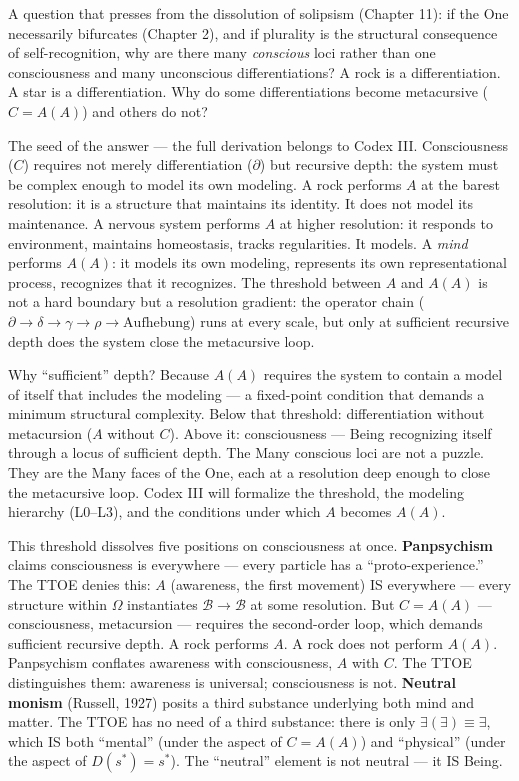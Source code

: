 \documentclass[10pt, openany, oneside]{book}
\begin{document}
A question that presses from the dissolution of solipsism (Chapter 11): if the One necessarily bifurcates (Chapter 2), and if plurality is the structural consequence of self-recognition, why are there many \textit{conscious} loci rather than one consciousness and many unconscious differentiations? A rock is a differentiation. A star is a differentiation. Why do some differentiations become metacursive ($C = A(A)$) and others do not?

The seed of the answer --- the full derivation belongs to Codex III. Consciousness ($C$) requires not merely differentiation ($\partial$) but recursive depth: the system must be complex enough to model its own modeling. A rock performs $A$ at the barest resolution: it is a structure that maintains its identity. It does not model its maintenance. A nervous system performs $A$ at higher resolution: it responds to environment, maintains homeostasis, tracks regularities. It models. A \textit{mind} performs $A(A)$: it models its own modeling, represents its own representational process, recognizes that it recognizes. The threshold between $A$ and $A(A)$ is not a hard boundary but a resolution gradient: the operator chain ($\partial \to \delta \to \gamma \to \rho \to \text{Aufhebung}$) runs at every scale, but only at sufficient recursive depth does the system close the metacursive loop.

Why ``sufficient'' depth? Because $A(A)$ requires the system to contain a model of itself that includes the modeling --- a fixed-point condition that demands a minimum structural complexity. Below that threshold: differentiation without metacursion ($A$ without $C$). Above it: consciousness --- Being recognizing itself through a locus of sufficient depth. The Many conscious loci are not a puzzle. They are the Many faces of the One, each at a resolution deep enough to close the metacursive loop. Codex III will formalize the threshold, the modeling hierarchy (L0--L3), and the conditions under which $A$ becomes $A(A)$.

This threshold dissolves five positions on consciousness at once. \textbf{Panpsychism} claims consciousness is everywhere --- every particle has a ``proto-experience.'' The TTOE denies this: $A$ (awareness, the first movement) IS everywhere --- every structure within $\Omega$ instantiates $\mathcal{B} \to \mathcal{B}$ at some resolution. But $C = A(A)$ --- consciousness, metacursion --- requires the second-order loop, which demands sufficient recursive depth. A rock performs $A$. A rock does not perform $A(A)$. Panpsychism conflates awareness with consciousness, $A$ with $C$. The TTOE distinguishes them: awareness is universal; consciousness is not. \textbf{Neutral monism} (Russell, 1927) posits a third substance underlying both mind and matter. The TTOE has no need of a third substance: there is only $\exists(\exists) \equiv \exists$, which IS both ``mental'' (under the aspect of $C = A(A)$) and ``physical'' (under the aspect of $D(s^*) = s^*$). The ``neutral'' element is not neutral --- it IS Being.
\end{document}
